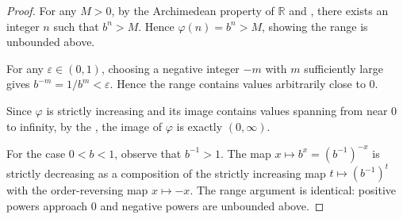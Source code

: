\begin{proof}
    For any $M > 0$, by the Archimedean property of $\mathbb{R}$ and , there exists an integer $n$ such that $b^n > M$. Hence $\varphi(n) = b^n > M$, showing the range is unbounded above.

    For any $\varepsilon \in (0, 1)$, choosing a negative integer $-m$ with $m$ sufficiently large gives $b^{-m} = 1/b^m < \varepsilon$. Hence the range contains values arbitrarily close to $0$.

    Since $\varphi$ is strictly increasing and its image contains values spanning from near $0$ to infinity, by the , the image of $\varphi$ is exactly $(0, \infty)$.

    For the case $0 < b < 1$, observe that $b^{-1} > 1$. The map $x \mapsto b^x = (b^{-1})^{-x}$ is strictly decreasing as a composition of the strictly increasing map $t \mapsto (b^{-1})^t$ with the order-reversing map $x \mapsto -x$. The range argument is identical: positive powers approach $0$ and negative powers are unbounded above.
\end{proof}
